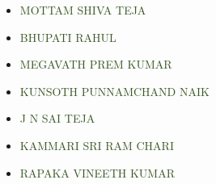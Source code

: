 \documentclass[12pt]{article}
\begin{document}
\begin{itemize}
	\item {\fontsize{20pt}{24.0pt}\selectfont \textcolor[HTML]{385623}{MOTTAM SHIVA TEJA}\par}\par

	\item {\fontsize{20pt}{24.0pt}\selectfont \textcolor[HTML]{385623}{BHUPATI RAHUL}\par}\par

	\item {\fontsize{20pt}{24.0pt}\selectfont \textcolor[HTML]{385623}{MEGAVATH PREM KUMAR}\par}\par

	\item {\fontsize{20pt}{24.0pt}\selectfont \textcolor[HTML]{385623}{KUNSOTH PUNNAMCHAND NAIK}\par}\par

	\item {\fontsize{20pt}{24.0pt}\selectfont \textcolor[HTML]{385623}{J N SAI TEJA}\par}\par

	\item {\fontsize{20pt}{24.0pt}\selectfont \textcolor[HTML]{385623}{KAMMARI SRI RAM CHARI}\par}\par

	\item {\fontsize{20pt}{24.0pt}\selectfont \textcolor[HTML]{385623}{RAPAKA VINEETH KUMAR}\par}
\end{itemize}\par


\vspace{\baselineskip}

\vspace{\baselineskip}

\vspace{\baselineskip}

\vspace{\baselineskip}

\vspace{\baselineskip}

\vspace{\baselineskip}

\vspace{\baselineskip}
\end{document}
